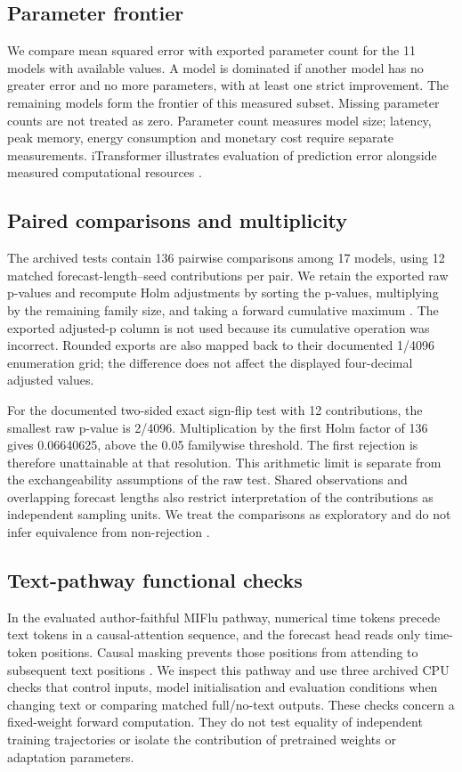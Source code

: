 \documentclass[journal,twoside,print]{ieeecolor}
\begin{document}
\subsection{Parameter frontier}
We compare mean squared error with exported parameter count for the 11 models with available values. A model is dominated if another model has no greater error and no more parameters, with at least one strict improvement. The remaining models form the frontier of this measured subset. Missing parameter counts are not treated as zero. Parameter count measures model size; latency, peak memory, energy consumption and monetary cost require separate measurements. iTransformer illustrates evaluation of prediction error alongside measured computational resources \cite{r5}.

\subsection{Paired comparisons and multiplicity}
The archived tests contain 136 pairwise comparisons among 17 models, using 12 matched forecast-length--seed contributions per pair. We retain the exported raw p-values and recompute Holm adjustments by sorting the p-values, multiplying by the remaining family size, and taking a forward cumulative maximum \cite{r20}. The exported adjusted-p column is not used because its cumulative operation was incorrect. Rounded exports are also mapped back to their documented 1/4096 enumeration grid; the difference does not affect the displayed four-decimal adjusted values.

For the documented two-sided exact sign-flip test with 12 contributions, the smallest raw p-value is 2/4096. Multiplication by the first Holm factor of 136 gives 0.06640625, above the 0.05 familywise threshold. The first rejection is therefore unattainable at that resolution. This arithmetic limit is separate from the exchangeability assumptions of the raw test. Shared observations and overlapping forecast lengths also restrict interpretation of the contributions as independent sampling units. We treat the comparisons as exploratory and do not infer equivalence from non-rejection \cite{r25}.

\subsection{Text-pathway functional checks}
In the evaluated author-faithful MIFlu pathway, numerical time tokens precede text tokens in a causal-attention sequence, and the forecast head reads only time-token positions. Causal masking prevents those positions from attending to subsequent text positions \cite{r24}. We inspect this pathway and use three archived CPU checks that control inputs, model initialisation and evaluation conditions when changing text or comparing matched full/no-text outputs. These checks concern a fixed-weight forward computation. They do not test equality of independent training trajectories or isolate the contribution of pretrained weights or adaptation parameters.
\end{document}
